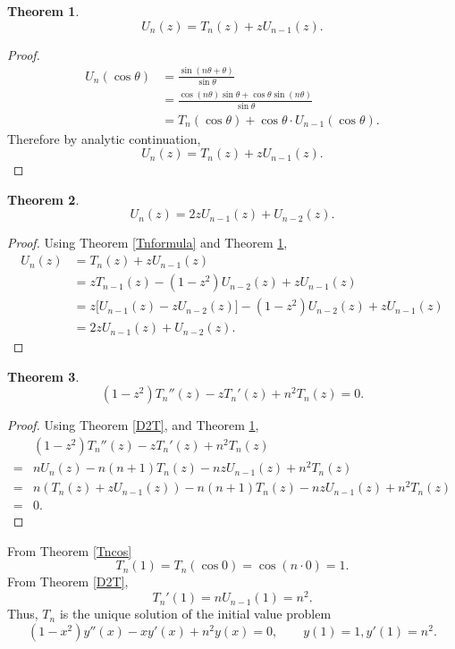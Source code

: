 \documentclass{article}
\newtheorem{theorem}{Theorem}
\theoremstyle{definition}
\begin{document}
\begin{theorem}
\[
U_n(z)=T_n(z)+zU_{n-1}(z).
\]
\label{Unformula}
\end{theorem}
\begin{proof}
\begin{align*}
U_n(\cos\theta)&=\frac{\sin (n\theta+\theta)}{\sin \theta}\\
&=\frac{\cos(n\theta)\sin\theta + \cos \theta \sin(n\theta)}{\sin \theta}\\
&=T_n(\cos \theta)+\cos \theta \cdot U_{n-1}(\cos \theta).
\end{align*}
Therefore by analytic continuation,
\[
U_n(z)=T_n(z)+zU_{n-1}(z).
\]
\end{proof}

\begin{theorem}
\[
U_n(z)=2zU_{n-1}(z)+U_{n-2}(z).
\]
\end{theorem}
\begin{proof}
Using Theorem \ref{Tnformula} and Theorem \ref{Unformula},
\begin{align*}
U_n(z) &= T_n(z)+zU_{n-1}(z)\\
&=zT_{n-1}(z) - (1-z^2)U_{n-2}(z)+zU_{n-1}(z)\\
&=z \bigg[U_{n-1}(z)-zU_{n-2}(z)\bigg] - (1-z^2)U_{n-2}(z) + zU_{n-1}(z)\\
&=2zU_{n-1}(z)+U_{n-2}(z).
\end{align*}
\end{proof}

\begin{theorem}
\[
(1-z^2)T_n''(z)-zT_n'(z)+n^2T_n(z)=0.
\]
\end{theorem}
\begin{proof}
Using Theorem \ref{D2T},
and Theorem \ref{Unformula},
\[
\begin{split}
&(1-z^2)T_n''(z)-zT_n'(z)+n^2T_n(z)\\
=&n U_n(z) - n(n+1)T_n(z)
-nzU_{n-1}(z)+n^2T_n(z)\\
=&n(T_n(z)+zU_{n-1}(z))-n(n+1)T_n(z)-nzU_{n-1}(z)+n^2T_n(z)\\
=&0.
\end{split}
\]
\end{proof}

From Theorem \ref{Tncos}
\[
T_n(1)=T_n(\cos 0) = \cos(n \cdot 0)=1.
\]
From Theorem \ref{D2T},
\[
T_n'(1) = nU_{n-1}(1) = n^2.
\]
Thus, $T_n$ is the unique solution of the initial value problem
\[
(1-x^2)y''(x)-xy'(x)+n^2y(x)=0,\qquad
y(1)=1,y'(1)=n^2.
\]
\end{document}
